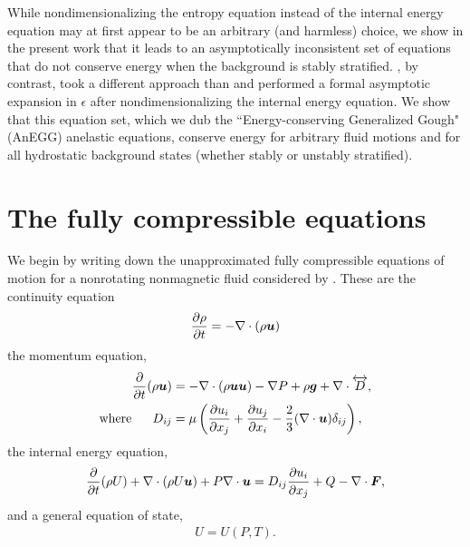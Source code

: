 \documentclass[12pt]{article}
\newcommand{\vecf}{\bm{F}}
\begin{document}
	While nondimensionalizing the entropy equation instead of the internal energy equation may at first appear to be an arbitrary (and harmless) choice, we show in the present work that it leads to an asymptotically inconsistent set of equations that do not conserve energy when the background is stably stratified. \citet{Gough1969}, by contrast, took a different approach than \citet{Ogura1962} and performed a formal asymptotic expansion in $\epsilon$ after nondimensionalizing the internal energy equation. We show that this equation set, which we dub the ``Energy-conserving Generalized Gough" (AnEGG) anelastic equations, conserve energy for arbitrary fluid motions and for all hydrostatic background states (whether stably or unstably stratified).
	
	\section{The fully compressible equations}
	We begin by writing down the unapproximated fully compressible equations of motion for a nonrotating nonmagnetic fluid considered by \citet{Gough1969}. These are the continuity equation 
	\begin{align}\label{eq:cont}
		\frac{\partial\rho}{\partial t}=-\nabla\cdot(\rho\bm{u}) 
	\end{align}
	the momentum equation,
	\begin{subequations}\label{eq:mom}
	\begin{align}
		\frac{\partial}{\partial t}(\rho\bm{u})&=-\nabla\cdot(\rho\bm{u}\bm{u}) - \nabla P +\rho\bm{g} +\nabla\cdot \overleftrightarrow{D},\label{eq:mommain}\\
		\text{where}\ \ \ \ \  D_{ij}& = \mu\left(\frac{\partial u_i}{\partial x_j} + \frac{\partial u_j}{\partial x_i} - \frac{2}{3}(\nabla\cdot\bm{u})\delta_{ij}\right),\label{eq:momvisc}
	\end{align}
	\end{subequations}
	the internal energy equation,
	\begin{align}\label{eq:en}
		\pderiv{}{t}(\rho U) + \Div(\rho U\vecu) + P\Div\vecu = D_{ij}\pderiv{u_i}{x_j} + Q - \Div\vecf,
	\end{align}
	and a general equation of state,
	\begin{align}\label{eq:eos}
		U = U(P,T).
	\end{align}
\end{document}
